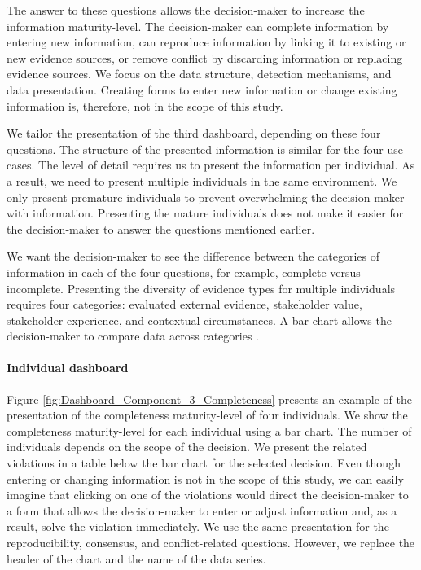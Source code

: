 The answer to these questions allows the decision-maker to increase the information maturity-level. The decision-maker can complete information by entering new information, can reproduce information by linking it to existing or new evidence sources, or remove conflict by discarding information or replacing evidence sources. We focus on the data structure, detection mechanisms, and data presentation. Creating forms to enter new information or change existing information is, therefore, not in the scope of this study. 

We tailor the presentation of the third dashboard, depending on these four questions. The structure of the presented information is similar for the four use-cases. The level of detail requires us to present the information per individual. As a result, we need to present multiple individuals in the same environment. We only present premature individuals to prevent overwhelming the decision-maker with information. Presenting the mature individuals does not make it easier for the decision-maker to answer the questions mentioned earlier.

We want the decision-maker to see the difference between the categories of information in each of the four questions, for example, complete versus incomplete. Presenting the diversity of evidence types for multiple individuals requires four categories: evaluated external evidence, stakeholder value, stakeholder experience, and contextual circumstances. A bar chart allows the decision-maker to compare data across categories \parencite{OTH09}. 

\paragraph{Individual dashboard}
Figure \ref{fig:Dashboard_Component_3_Completeness} presents an example of the presentation of the completeness maturity-level of four individuals. We show the completeness maturity-level for each individual using a bar chart. The number of individuals depends on the scope of the decision. We present the related violations in a table below the bar chart for the selected decision. Even though entering or changing information is not in the scope of this study, we can easily imagine that clicking on one of the violations would direct the decision-maker to a form that allows the decision-maker to enter or adjust information and, as a result, solve the violation immediately. We use the same presentation for the reproducibility, consensus, and conflict-related questions. However, we replace the header of the chart and the name of the data series.

